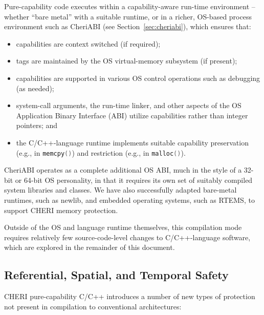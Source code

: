 \documentclass[11pt]{article}
\newcommand{\ccode}[1]{\lstinline[language={C},basicstyle=\small\ttfamily]{#1}}
\newcommand{\cfunc}[1]{\ccode{#1()}}
\begin{document}
Pure-capability code executes within a capability-aware run-time environment
-- whether ``bare metal'' with a suitable runtime, or in a richer, OS-based
process environment such as CheriABI (see Section~\ref{sec:cheriabi}),
which ensures that:
\begin{itemize}
  \item capabilities are context switched (if required);
  \item tags are maintained by the OS virtual-memory subsystem (if present);
  \item capabilities are supported in various OS control operations such as
    debugging (as needed);
  \item system-call arguments, the
run-time linker, and other aspects of the OS Application Binary Interface
(ABI) utilize capabilities rather than integer pointers; and
  \item the C/C++-language runtime implements suitable capability preservation
    (e.g., in \cfunc{memcpy}) and restriction (e.g., in \cfunc{malloc}).
\end{itemize}
CheriABI operates as a complete additional OS ABI, much in the style of a
32-bit or 64-bit OS personality, in that it requires its own set of suitably
compiled system libraries and classes.
We have also successfully adapted bare-metal runtimes, such as newlib, and
embedded operating systems, such as RTEMS, to support CHERI memory protection.

Outside of the OS and language runtime themselves, this compilation mode
requires relatively few source-code-level changes to C/C++-language software,
which are explored in the remainder of this document.

\subsection{Referential, Spatial, and Temporal Safety}

CHERI pure-capability C/C++ introduces a number of new types of protection not
present in compilation to conventional architectures:
\end{document}
